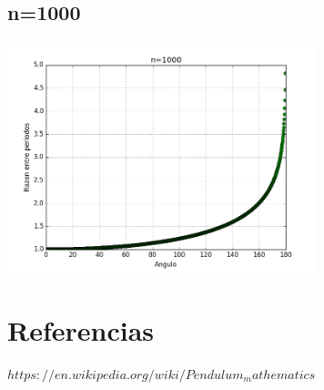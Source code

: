 \documentclass[12pt]{article}
\begin{document}
\subsection{n=1000}
\includegraphics[width=9cm]{figure_3}
\\
\section{Referencias}
$ https://en.wikipedia.org/wiki/Pendulum_mathematics 
$
\end{document}
